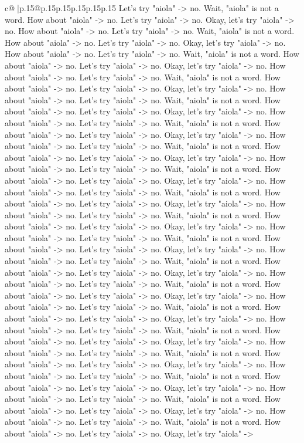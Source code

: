 \documentclass{article}
\begin{document}
{\begin{supertabular}{c@{$\;$}|p{.15\linewidth}@{}p{.15\linewidth}p{.15\linewidth}p{.15\linewidth}p{.15\linewidth}p{.15\linewidth}}
{{{Let's try "aiola" {-}> no. Wait, "aiola" is not a word. How about "aiola" {-}> no. Let's try "aiola" {-}> no. Okay, let's try "aiola" {-}> no. How about "aiola" {-}> no. Let's try "aiola" {-}> no. Wait, "aiola" is not a word. How about "aiola" {-}> no. Let's try "aiola" {-}> no. Okay, let's try "aiola" {-}> no. How about "aiola" {-}> no. Let's try "aiola" {-}> no. Wait, "aiola" is not a word. How about "aiola" {-}> no. Let's try "aiola" {-}> no. Okay, let's try "aiola" {-}> no. How about "aiola" {-}> no. Let's try "aiola" {-}> no. Wait, "aiola" is not a word. How about "aiola" {-}> no. Let's try "aiola" {-}> no. Okay, let's try "aiola" {-}> no. How about "aiola" {-}> no. Let's try "aiola" {-}> no. Wait, "aiola" is not a word. How about "aiola" {-}> no. Let's try "aiola" {-}> no. Okay, let's try "aiola" {-}> no. How about "aiola" {-}> no. Let's try "aiola" {-}> no. Wait, "aiola" is not a word. How about "aiola" {-}> no. Let's try "aiola" {-}> no. Okay, let's try "aiola" {-}> no. How about "aiola" {-}> no. Let's try "aiola" {-}> no. Wait, "aiola" is not a word. How about "aiola" {-}> no. Let's try "aiola" {-}> no. Okay, let's try "aiola" {-}> no. How about "aiola" {-}> no. Let's try "aiola" {-}> no. Wait, "aiola" is not a word. How about "aiola" {-}> no. Let's try "aiola" {-}> no. Okay, let's try "aiola" {-}> no. How about "aiola" {-}> no. Let's try "aiola" {-}> no. Wait, "aiola" is not a word. How about "aiola" {-}> no. Let's try "aiola" {-}> no. Okay, let's try "aiola" {-}> no. How about "aiola" {-}> no. Let's try "aiola" {-}> no. Wait, "aiola" is not a word. How about "aiola" {-}> no. Let's try "aiola" {-}> no. Okay, let's try "aiola" {-}> no. How about "aiola" {-}> no. Let's try "aiola" {-}> no. Wait, "aiola" is not a word. How about "aiola" {-}> no. Let's try "aiola" {-}> no. Okay, let's try "aiola" {-}> no. How about "aiola" {-}> no. Let's try "aiola" {-}> no. Wait, "aiola" is not a word. How about "aiola" {-}> no. Let's try "aiola" {-}> no. Okay, let's try "aiola" {-}> no. How about "aiola" {-}> no. Let's try "aiola" {-}> no. Wait, "aiola" is not a word. How about "aiola" {-}> no. Let's try "aiola" {-}> no. Okay, let's try "aiola" {-}> no. How about "aiola" {-}> no. Let's try "aiola" {-}> no. Wait, "aiola" is not a word. How about "aiola" {-}> no. Let's try "aiola" {-}> no. Okay, let's try "aiola" {-}> no. How about "aiola" {-}> no. Let's try "aiola" {-}> no. Wait, "aiola" is not a word. How about "aiola" {-}> no. Let's try "aiola" {-}> no. Okay, let's try "aiola" {-}> no. How about "aiola" {-}> no. Let's try "aiola" {-}> no. Wait, "aiola" is not a word. How about "aiola" {-}> no. Let's try "aiola" {-}> no. Okay, let's try "aiola" {-}> no. How about "aiola" {-}> no. Let's try "aiola" {-}> no. Wait, "aiola" is not a word. How about "aiola" {-}> no. Let's try "aiola" {-}> no. Okay, let's try "aiola" {-}> no. How about "aiola" {-}> no. Let's try "aiola" {-}> no. Wait, "aiola" is not a word. How about "aiola" {-}> no. Let's try "aiola" {-}> no. Okay, let's try "aiola" {-}> no. How about "aiola" {-}> no. Let's try "aiola" {-}> no. Wait, "aiola" is not a word. How about "aiola" {-}> no. Let's try "aiola" {-}> no. Okay, let's try "aiola" {-}> }}}
\end{supertabular}}
\end{document}
